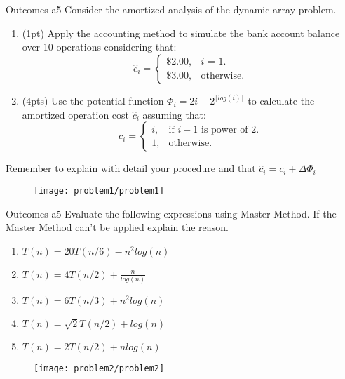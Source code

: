 \begin{problem}{Outcomes a}{5}
    Consider the amortized analysis of the dynamic array problem.

    \begin{enumerate}[label=(\roman*)]
        \item (1pt) Apply the accounting method to simulate the bank account balance over 10 operations considering that:
            \[
                \hat{c}_{i} =
                \begin{cases}
                    \$2.00, & \text{$i$ = 1}.\\
                    \$3.00, & \text{otherwise}.
                \end{cases}
            \]
        \item (4pts) Use the potential function $\Phi_{i} = 2i - 2^{\lceil log(i) \rceil}$ to calculate the amortized operation cost $\hat{c}_{i}$ assuming that:
            \[
                c_{i} =
                \begin{cases}
                    i, & \text{if $i-1$ is power of $2$}.\\
                    1, & \text{otherwise}.
                \end{cases}
            \]
    \end{enumerate}

    Remember to explain with detail your procedure and that $\hat{c}_{i} = c_{i} + \Delta\Phi_{i} $

    \begin{figure}[H]
        \centering
        \texttt{[image: problem1/problem1]}
    \end{figure}

\end{problem}

\begin{problem}{Outcomes a}{5}
    Evaluate the following expressions using Master Method. If the Master Method can't be applied explain the reason.

    \begin{enumerate}[label=(\roman*)]
        \item $T(n) = 20T(n/6) - n^{2}log(n)$
        \item $T(n) = 4T(n/2) + \frac{n}{log(n)}$
        \item $T(n) = 6T(n/3) + n^{2}log(n)$
        \item $T(n) = \sqrt{2}T(n/2) + log(n)$
        \item $T(n) = 2T(n/2) + nlog(n)$
    \end{enumerate}

    \begin{figure}[H]
        \centering
        \texttt{[image: problem2/problem2]}
    \end{figure}
\end{problem}

